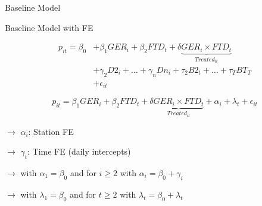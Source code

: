 







\begin{frame}{Baseline Model}

\vspace{-0.7cm}

\begin{block}{Baseline Model with FE}

\small

\vspace{-0.3cm}

\begin{equation}
\begin{aligned}
\label{eq:Base_DiD2}
p_{it} = \beta_{0} &+ \beta_{1} GER_{i} + \beta_{2} FTD_{t} + \delta \underbrace{GER_{i} \times FTD_{t}}_{Treated_{it}} \\
 &+ \gamma_{2}D2_{i} + \text{…} + \gamma_{n}Dn_{i} + \tau_{2}B2_{t} + \text{…} + \tau_{T}BT_{T} \\
 &+ \epsilon_{it}
\end{aligned}
\end{equation}

\vspace{-0.2cm}

\begin{equation}
\label{eq:Base_DiD3}
p_{it} = \beta_{1} GER_{i} + \beta_{2} FTD_{t} + \delta \underbrace{GER_{i} \times FTD_{t}}_{Treated_{it}} + \alpha_{i} + \lambda_{t} + \epsilon_{it}
\end{equation}




\end{block}

\small

$\longrightarrow$ $\alpha_{i}$: Station FE 

$\longrightarrow$ $\gamma_{t}$: Time FE (daily intercepts)

$\longrightarrow$ with $\alpha_{1} = \beta_{0}$ and for $i \geq 2$ with $\alpha_{i} = \beta_{0} + \gamma_{i}$

$\longrightarrow$ with $\lambda_{1} = \beta_{0}$ and for $t \geq 2$ with $\lambda_{t} = \beta_{0} + \lambda_{t}$


\end{frame}



